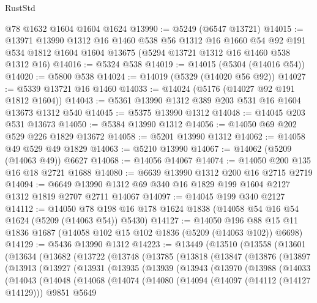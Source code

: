 \begin{lexlean}{RustStd}
\begin{coremodule}
    @78
    @1632
    @1604
    @1604
    @1624
@13990 := @5249 (@6547 @13721)
@14015 := @13971
    @13990
    @1312
    @16
    @1460
    @538
    @56
    @1312
    @16
    @1660
    @54
    @92
    @191
    @534
    @1812
    @1604
    @1604
    @13675
    (@5294 @13721 @1312 @16 @1460 @538 @1312 @16)
@14016 := @5324 @538
@14019 := @14015 (@5304 (@14016 @54))
@14020 := @5800 @538
@14024 := @14019 (@5329 (@14020 @56 @92))
@14027 := @5339 @13721 @16 @1460
@14033 := @14024 (@5176 (@14027 @92 @191 @1812 @1604))
@14043 := @5361 @13990 @1312 @389 @203 @531 @16 @1604 @13673 @1312 @540
@14045 := @5375 @13990 @1312
@14048 := @14045 @203 @531 @13673
@14050 := @5384 @13990 @1312
@14056 := @14050 @69 @202 @529 @226 @1829 @13672
@14058 := @5201 @13990 @1312
@14062 := @14058 @49 @529 @49 @1829
@14063 := @5210 @13990
@14067 := @14062 (@5209 (@14063 @49)) @6627
@14068 := @14056 @14067
@14074 := @14050 @200 @135 @16 @18 @2721 @1688
@14080 := @6639 @13990 @1312 @200 @16 @2715 @2719
@14094 := @6649 @13990 @1312 @69 @340 @16 @1829 @199 @1604 @2127 @1312 @1819 @2707 @2711 @14067
@14097 := @14045 @199 @340 @2127
@14112 := @14050 @78 @198 @16 @178 @1624 @1838 (@14058 @54 @16 @54 @1624 (@5209 (@14063 @54)) @5430)
@14127 := @14050
    @196
    @88
    @15
    @11
    @1836
    @1687
    (@14058 @102 @15 @102 @1836 (@5209 (@14063 @102)) @6698)
@14129 := @5436 @13990 @1312
@14223 := @13449
    (@13510
      (@13558
        (@13601
          (@13634
            (@13682
              (@13722
                (@13748
                  (@13785
                    (@13818
                      (@13847
                        (@13876
                          (@13897
                            (@13913
                              (@13927
                                (@13931
                                  (@13935
                                    (@13939
                                      (@13943
                                        (@13970
                                          (@13988
                                            (@14033
                                              (@14043
                                                (@14048
                                                  (@14068
                                                    (@14074
                                                      (@14080
                                                        (@14094
                                                          (@14097 (@14112 (@14127 @14129)))
                                                          @9851
                                                          @5649

\end{coremodule}
\end{lexlean}
